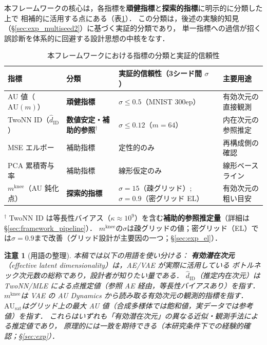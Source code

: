 \documentclass[11pt,a4paper]{jsarticle}
\newtheorem{remark}{注意}
\newcommand{\kap}{\kappa}
\newcommand{\AUsat}{\mathrm{AU}_{\mathrm{sat}}}
\newcommand{\mknee}{m^{\mathrm{knee}}}
\begin{document}
本フレームワークの核心は，各指標を\textbf{頑健指標}と\textbf{探索的指標}に明示的に分類した上で
相補的に活用する点にある（表\ref{tab:indicator_class}）．
この分類は，後述の実験的知見（§\ref{sec:exp_multiseed2}）に基づく実証的分類であり，
単一指標への過信が招く誤診断を体系的に回避する設計思想の中核をなす．

\begin{table}[H]
\centering
\caption{本フレームワークにおける指標の分類と実証的信頼性}
\label{tab:indicator_class}
\small
\begin{tabular}{llll}
\toprule
指標 & 分類 & 実証的信頼性（3シード間 $\sigma$） & 主要用途 \\
\midrule
AU 値（$\mathrm{AU}(m)$） & \textbf{頑健指標} & $\sigma \leq 0.5$（MNIST 300ep） & 有効次元の直接観測 \\
TwoNN ID（$\hat{d}_\mathrm{ID}$） & \textbf{数値安定・補助的参照}$^\dagger$ & $\sigma \leq 0.12$（$m=64$） & 内在次元の参照推定 \\
MSE エルボー & 補助指標 & 定性的のみ & 再構成側の確認 \\
PCA 累積寄与率 & 補助指標 & 線形仮定のみ & 線形ベースライン \\
$\mknee$（AU 鈍化点） & \textbf{探索的指標} & $\sigma = 15$（疎グリッド）; $\sigma = 0.9$（密グリッド EL） & 有効次元の粗い目安 \\
\bottomrule
\end{tabular}
\medskip
\footnotesize
$^\dagger$ TwoNN ID は等長性バイアス（$\kap \approx 10^9$）を含む\textbf{補助的参照推定量}（詳細は§\ref{sec:framework_pipeline}）．
$\mknee$の$\sigma$は疎グリッドの値；密グリッド（EL）では$\sigma=0.9$まで改善（グリッド設計が主要因の一つ；§\ref{sec:exp_el}）．
\normalsize
\end{table}

\begin{remark}[用語の整理]
本稿では以下の用語を使い分ける：
\textbf{有効潜在次元}（effective latent dimensionality）は，AE/VAE が実際に活用している
ボトルネック次元数の総称であり，設計者が知りたい量である．
\textbf{$\hat{d}_\mathrm{ID}$}（推定内在次元）は TwoNN/MLE による点推定値（参照 AE 経由，等長性バイアスあり）を指す．
\textbf{$\mknee$}は VAE の AU Dynamics から読み取る有効次元の観測的指標を指す．
\textbf{$\AUsat$}はグリッド上の最大 AU 値（合成多様体では飽和値，実データでは参考値）を指す．
これらはいずれも「有効潜在次元」の異なる近似・観測手法による推定値であり，
原理的には一致を期待できる（本研究条件下での経験的確認；§\ref{sec:exp}）．
\end{remark}
\end{document}
